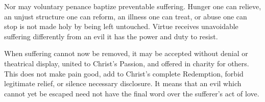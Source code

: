 Nor may voluntary penance baptize preventable suffering. Hunger one can relieve, an unjust structure one can reform, an illness one can treat, or abuse one can stop is not made holy by being left untouched. Virtue receives unavoidable suffering differently from an evil it has the power and duty to resist.

When suffering cannot now be removed, it may be accepted without denial or theatrical display, united to Christ's Passion, and offered in charity for others. This does not make pain good, add to Christ's complete Redemption, forbid legitimate relief, or silence necessary disclosure. It means that an evil which cannot yet be escaped need not have the final word over the sufferer's act of love.
